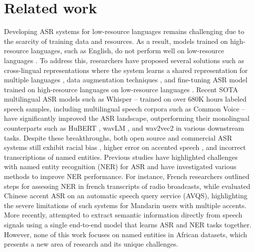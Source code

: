 \documentclass{INTERSPEECH2023}
\begin{document}
\section{Related work}
Developing ASR systems for low-resource languages remains challenging due to the scarcity of training data and resources. As a result, models trained on high-resource languages, such as English, do not perform well on low-resource languages \cite{lepak2021generalisation}. To address this, researchers have proposed several solutions such as cross-lingual representations where the system learns a shared representation for multiple languages \cite{conneau2017word}, data augmentation techniques \cite{feng2021survey}, and fine-tuning ASR model trained on high-resource languages on low-resource languages \cite{anaby2020not}.
Recent SOTA multilingual ASR models such as Whisper \cite{radford2022robust} -- trained on over 680K hours labeled speech samples, including multilingual speech corpora such as Common Voice \cite{commonvoice} -- have significantly improved the ASR landscape, outperforming their monolingual counterparts such as HuBERT \cite{hsu2021hubert}, wavLM \cite{chen2022wavlm}, and wav2vec2 \cite{baevski2020wav2vec} in various downstream tasks. 
Despite these breakthroughs, both open source and commercial ASR systems still exhibit racial bias \cite{koenecke2020racial}, higher error on accented speech \cite{hinsvark2021accented}, and incorrect transcriptions of named entities. Previous studies have highlighted challenges with named entity recognition (NER) for ASR and have investigated various methods to improve NER performance. For instance, French researchers \cite{galliano2009ester} outlined steps for assessing NER in french transcripts of radio broadcasts, while \cite{xiao2021automatic} evaluated Chinese accent ASR on an automatic speech query service (AVQS), highlighting the severe limitations of such systems for Mandarin users with multiple accents. More recently, \cite{mdhaffar2022end, caubriere2020we} attempted to extract semantic information directly from speech signals using a single end-to-end model that learns ASR and NER tasks together. However, none of this work focuses on named entities in African datasets, which presents a new area of research and its unique challenges.

\end{document}
